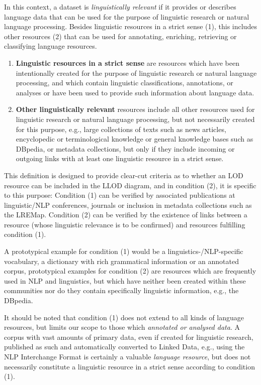 In this context, a dataset is \emph{linguistically relevant} if it provides or  describes language data that can be used for the purpose of linguistic research or natural language processing. Besides linguistic resources in  a strict sense (1), this includes other resources (2) that can be used for  annotating, enriching, retrieving or classifying language resources.
\begin{enumerate}[(1)]
\item \textbf{Linguistic resources in a strict sense} are resources which have been intentionally created for the purpose of linguistic research or natural language processing, and which contain linguistic classifications, annotations, or analyses or have been used to provide such information about language data.
\item \textbf{Other linguistically relevant} resources include all other  resources used for linguistic research or natural language processing,  but not necessarily created for this purpose, e.g., large collections of  texts such as news articles, encyclopedic or terminological knowledge  or general knowledge bases such as DBpedia, or metadata collections, but only if they include incoming or outgoing links with at least one linguistic resource in a strict sense. 
\end{enumerate}

This definition is designed to provide clear-cut criteria as to whether an LOD resource can be included in the LLOD diagram, and in condition (2), it is specific to this purpose:
Condition (1) can be verified by associated publications at linguistic/NLP conferences, journals or inclusion in metadata collections such as the LREMap. 
Condition (2) can be verified by the existence of links between a resource (whose linguistic relevance is to be confirmed) and resources fulfilling condition (1).

A prototypical example for condition (1) would be a linguistics-/NLP-specific vocabulary, a dictionary with rich grammatical information or an annotated corpus, prototypical examples for condition (2) are resources which are frequently used in NLP and linguistics, but which have neither been created within these communities nor do they contain specifically linguistic information, e.g., the DBpedia.

It should be noted that condition (1) does not extend to all kinds of language resources, but limits our scope to those which \emph{annotated or analysed data}. 
A corpus with vast amounts of primary data, even if created for linguistic research, published as such and automatically converted to Linked Data, e.g., using the NLP Interchange Format
is certainly a valuable \emph{language resource}, but does not necessarily constitute a linguistic resource in a strict sense according to condition (1).


